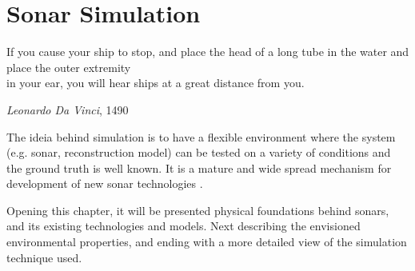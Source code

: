 \chapter{Sonar Simulation}

\epigraph{If you cause your ship to stop, and place the head of a long tube in
the water and place the outer extremity\\ in your ear, you will hear ships at a
great distance from you.}{\textit{Leonardo Da Vinci}, 1490}


The ideia behind simulation is to have a flexible environment where the system
(e.g. sonar, reconstruction model) can be tested on a variety of conditions
and the ground truth is well known. It is a mature and wide spread
mechanism for development of new sonar technologies \cite{Etter2013}.

Opening this chapter, it will be presented physical foundations behind sonars,
and its existing technologies and models. Next describing the envisioned
environmental properties, and ending  with  a more detailed view of the
simulation technique used.




